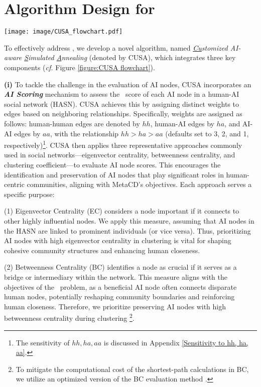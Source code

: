 \section{Algorithm Design for \problem}
\label{sec:method}

\begin{figure*}[ht]
    \centering
    \texttt{[image: image/CUSA\_flowchart.pdf]}
    \caption{The framework of the proposed CUSA algorithm.}
    \label{figure:CUSA flowchart}
\end{figure*}

To effectively address \problem, we develop a novel algorithm, named \textit{\underline{Cu}stomized AI-aware \underline{S}imulated \underline{A}nnealing} (denoted by CUSA), which integrates three key components (\textit{cf.} Figure \ref{figure:CUSA flowchart}).

\textbf{(i)} To tackle the challenge in the evaluation of AI nodes, CUSA incorporates an \textit{\textbf{AI Scoring}} mechanism to assess the \score\ score of each AI node in a human-AI social network (HASN). CUSA achieves this by assigning distinct weights to edges based on neighboring relationships. Specifically, weights are assigned as follows: human-human edges are denoted by $hh$, human-AI edges by $ha$, and AI-AI edges by $aa$, with the relationship $hh > ha > aa$ (defaults set to 3, 2, and 1, respectively)\footnote{The sensitivity of $hh, ha, aa$ is discussed in Appendix \ref{Sensitivity to hh, ha, aa}.}. CUSA then applies three representative approaches commonly used in social networks—eigenvector centrality, betweenness centrality, and clustering coefficient—to evaluate AI node scores. This encourages the identification and preservation of AI nodes that play significant roles in human-centric communities, aligning with MetaCD’s objectives. Each approach serves a specific purpose:

\noindent (1) Eigenvector Centrality (EC) \cite{freeman2002centrality} considers a node important if it connects to other highly influential nodes. We apply this measure, assuming that AI nodes in the HASN are linked to prominent individuals (or vice versa). Thus, prioritizing AI nodes with high eigenvector centrality in clustering is vital for shaping cohesive community structures and enhancing human closeness.

\noindent (2) Betweenness Centrality (BC) \cite{brandes2001faster} identifies a node as crucial if it serves as a bridge or intermediary within the network. This measure aligns with the objectives of the \problem\ problem, as a beneficial AI node often connects disparate human nodes, potentially reshaping community boundaries and reinforcing human closeness. Therefore, we prioritize preserving AI nodes with high betweenness centrality during clustering \footnote{To mitigate the computational cost of the shortest-path calculations in BC, we utilize an optimized version of the BC evaluation method \cite{brandes2001faster}.}.

